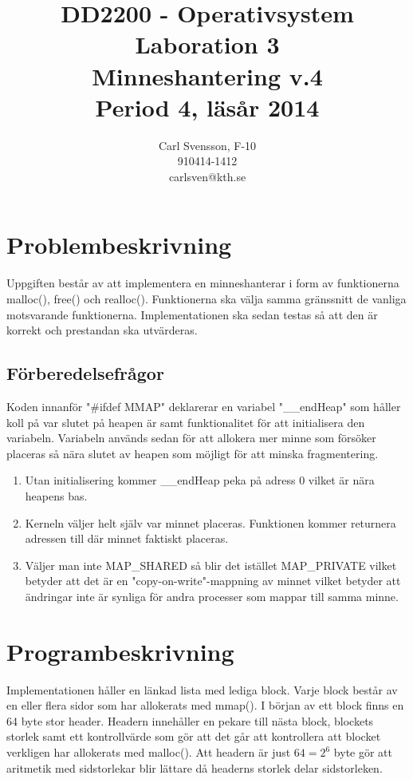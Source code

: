 \documentclass[10pt,a4paper]{article}
\title{DD2200 - Operativsystem \\ Laboration 3 \\ Minneshantering v.4 \\ Period 4, läsår 2014}
\author{Carl Svensson, F-10 \\ 910414-1412 \\ carlsven@kth.se}
\date{}
\begin{document}
\maketitle
\tableofcontents
\clearpage

\section{Problembeskrivning}

Uppgiften består av att implementera en minneshanterar i form av funktionerna malloc(), free() och realloc(). Funktionerna ska välja samma gränssnitt de vanliga motsvarande funktionerna. Implementationen ska sedan testas så att den är korrekt och prestandan ska utvärderas.

\subsection{Förberedelsefrågor}

Koden innanför "\#ifdef MMAP" deklarerar en variabel "\_\_endHeap" som håller koll på var slutet på heapen är samt funktionalitet för att initialisera den variabeln. Variabeln används sedan för att allokera mer minne som försöker placeras så nära slutet av heapen som möjligt för att minska fragmentering.

\begin{enumerate}
\item Utan initialisering kommer \_\_endHeap peka på adress 0 vilket är nära heapens bas.
\item Kerneln väljer helt själv var minnet placeras. Funktionen kommer returnera adressen till där minnet faktiskt placeras.
\item Väljer man inte MAP\_SHARED så blir det istället MAP\_PRIVATE vilket betyder att det är en "copy-on-write"-mappning av minnet vilket betyder att ändringar inte är synliga för andra processer som mappar till samma minne.
\end{enumerate}

\section{Programbeskrivning}

Implementationen håller en länkad lista med lediga block. Varje block består av en eller flera sidor som har allokerats med mmap(). I början av ett block finns en 64 byte stor header. Headern innehåller en pekare till nästa block, blockets storlek samt ett kontrollvärde som gör att det går att kontrollera att blocket verkligen har allokerats med malloc(). Att headern är just $64=2^6$ byte gör att aritmetik med sidstorlekar blir lättare då headerns storlek delar sidstorleken.
\end{document}
